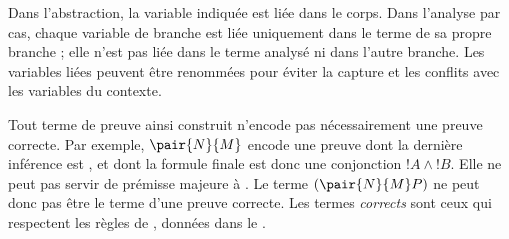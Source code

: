 \documentclass[../../../include/open-logic-section]{subfiles}
\begin{document}
Dans l'abstraction, la variable indiquée est liée dans le corps.
Dans l'analyse par cas, chaque variable de branche est liée
uniquement dans le terme de sa propre branche ; elle n'est
pas liée dans le terme analysé ni dans l'autre branche.
Les variables liées peuvent être renommées pour éviter
la capture et les conflits avec les variables du contexte.

Tout terme de preuve ainsi construit n'encode pas
nécessairement une preuve correcte.
Par exemple, $\pair{N}{M}$ encode une preuve dont la
dernière inférence est \Intro{\land}, et dont la formule
finale est donc une conjonction $!A \land !B$.
Elle ne peut pas servir de prémisse majeure à \Elim{\lif}.
Le terme $(\pair{N}{M}P)$ ne peut donc pas être le terme
d'une preuve correcte. Les termes \emph{corrects}
sont ceux qui respectent les règles de ,
données dans le .


\end{document}
